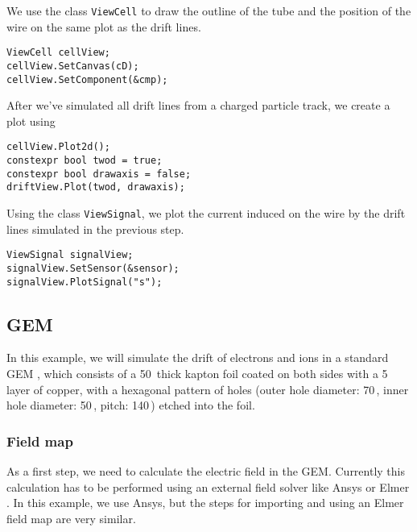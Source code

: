 We use the class \texttt{ViewCell} to draw the
outline of the tube and the position of the wire on the same plot as the
drift lines.
\begin{lstlisting}
ViewCell cellView;
cellView.SetCanvas(cD);
cellView.SetComponent(&cmp);
\end{lstlisting}
After we've simulated all drift lines from a charged particle 
track, we create a plot using
\begin{lstlisting}
cellView.Plot2d();
constexpr bool twod = true;
constexpr bool drawaxis = false;
driftView.Plot(twod, drawaxis);
\end{lstlisting}

Using the class \texttt{ViewSignal}, we plot the current induced on 
the wire by the drift lines simulated in the previous step.
\begin{lstlisting}
ViewSignal signalView;
signalView.SetSensor(&sensor);
signalView.PlotSignal("s");
\end{lstlisting}

\subsection{GEM}\label{Sec:ExampleGem}
In this example, we will simulate the drift of electrons and ions 
in a standard GEM \cite{Sauli2016}, 
which consists of a 50\, thick kapton foil 
coated on both sides with a 5\, layer of copper, 
with a hexagonal pattern of holes (outer hole diameter: 70\,, 
inner hole diameter: 50\,, pitch: 140\,) 
etched into the foil.
\subsubsection{Field map}
As a first step, we need to calculate the electric field in the GEM. 
Currently this calculation has to be performed using an external field 
solver like Ansys \cite{ANSYS} or Elmer \cite{Elmer}. In this example, 
we use Ansys, but the steps for importing and using an Elmer field map 
are very similar.

